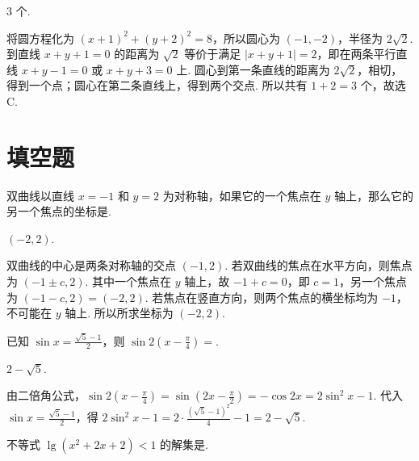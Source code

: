 \documentclass[UTF8,a4paper,oneside,11pt]{ctexbook}
\begin{document}
\begin{answer}
\(3\) 个.
\end{answer}

\begin{solution}
将圆方程化为 \((x+1)^2+(y+2)^2=8\)，所以圆心为 \((-1,-2)\)，半径为 \(2\sqrt2\). 到直线 \(x+y+1=0\) 的距离为 \(\sqrt2\) 等价于满足 \(\lvert x+y+1\rvert=2\)，即在两条平行直线 \(x+y-1=0\) 或 \(x+y+3=0\) 上. 圆心到第一条直线的距离为 \(2\sqrt2\)，相切，得到一个点；圆心在第二条直线上，得到两个交点. 所以共有 \(1+2=3\) 个，故选 C.
\end{solution}

\section{填空题}

\begin{problem}
双曲线以直线 \(x = -1\) 和 \(y = 2\) 为对称轴，如果它的一个焦点在 \(y\) 轴上，那么它的另一个焦点的坐标是\fillinblank{}.
\end{problem}

\begin{answer}
\((-2,2)\).
\end{answer}

\begin{solution}
双曲线的中心是两条对称轴的交点 \((-1,2)\). 若双曲线的焦点在水平方向，则焦点为 \((-1\pm c,2)\). 其中一个焦点在 \(y\) 轴上，故 \(-1+c=0\)，即 \(c=1\)，另一个焦点为 \((-1-c,2)=(-2,2)\). 若焦点在竖直方向，则两个焦点的横坐标均为 \(-1\)，不可能在 \(y\) 轴上. 所以所求坐标为 \((-2,2)\).
\end{solution}

\begin{problem}
已知 \(\sin x = \frac{\sqrt{5} - 1}{2}\)，则 \(\sin 2\left(x - \frac{\pi}{4}\right)=\)\fillinblank{}.
\end{problem}

\begin{answer}
\(2-\sqrt{5}\).
\end{answer}

\begin{solution}
由二倍角公式，\(\sin2\left(x-\frac\pi4\right)=\sin\left(2x-\frac\pi2\right)=-\cos2x=2\sin^2x-1\). 代入 \(\sin x=\frac{\sqrt5-1}{2}\)，得 \(2\sin^2x-1=2\cdot\frac{(\sqrt5-1)^2}{4}-1=2-\sqrt5\).
\end{solution}

\begin{problem}
不等式 \(\lg \left(x^{2}+2x+2\right)<1\) 的解集是\fillinblank{}.
\end{problem}
\end{document}
